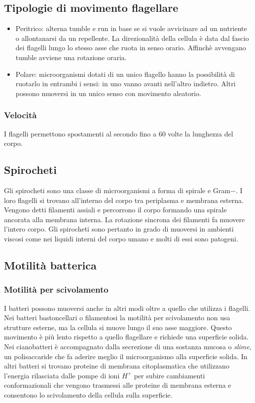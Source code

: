 	\subsection{Tipologie di movimento flagellare}
	\begin{multicols}{2}
		\begin{itemize}
			\item Peritrico: alterna tumble e run in base se si vuole avvicinare ad un nutriente o allontanarsi da un repellente.
				La direzionalit\`a della cellula \`e data dal fascio dei flagelli lungo lo stesso asse che ruota in senso orario.
				Affinch\`e avvengano tumble avviene una rotazione oraria.
			\item Polare: microorganismi dotati di un unico flagello hanno la possibilit\`a di ruotarlo in entrambi i sensi: in uno vanno avanti nell'altro indietro.
				Altri possono muoversi in un unico senso con movimento aleatorio.
		\end{itemize}
	\end{multicols}

		\subsubsection{Velocit\`a}
		I flagelli permettono spostamenti al secondo fino a $60$ volte la lunghezza del corpo.

	\subsection{Spirocheti}
	Gli spirocheti sono una classe di microorganismi a forma di spirale e Gram$-$.
	I loro flagelli si trovano all'interno del corpo tra periplasma e membrana esterna.
	Vengono detti filamenti assiali e percorrono il corpo formando una spirale ancorata alla membrana interna.
	La rotazione sincrona dei filamenti fa muovere l'intero corpo.
	Gli spirocheti sono pertanto in grado di muoversi in ambienti viscosi come nei liquidi interni del corpo umano e molti di essi sono patogeni.

	\subsection{Motilit\`a batterica}

		\subsubsection{Motilit\`a per scivolamento}
		I batteri possono muoversi anche in altri modi oltre a quello che utilizza i flagelli.
		Nei batteri bastoncellari o filamentosi la motilit\`a per scivolamento non usa strutture esterne, ma la cellula si muove lungo il suo asse maggiore.
		Questo movimento \`e pi\`u lento rispetto a quello flagellare e richiede una superficie solida.
		Nei cianobatteri \`e accompagnato dalla secrezione di una sostanza mucosa o \emph{slime}, un polisaccaride che fa aderire meglio il microorganismo alla superficie solida.
		In altri batteri si trovano proteine di membrana citoplasmatica che utilizzano l'energia rilasciata dalle pompe di ioni \emph{$H^+$} per subire cambiamenti conformazionali che vengono trasmessi alle proteine di membrana esterna e consentono lo scivolamento della cellula sulla superficie.

